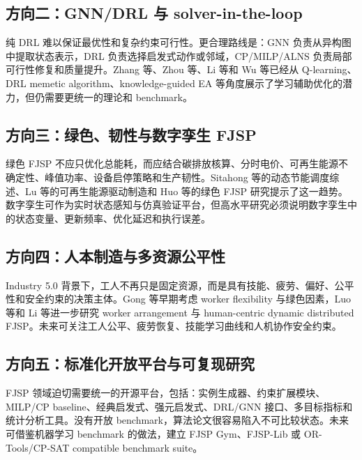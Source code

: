 \documentclass[UTF8,a4paper,11pt]{ctexart}
\begin{document}
\subsection{方向二：GNN/DRL 与 solver-in-the-loop}

纯 DRL 难以保证最优性和复杂约束可行性。更合理路线是：GNN 负责从异构图中提取状态表示，DRL 负责选择启发式动作或邻域，CP/MILP/ALNS 负责局部可行性修复和质量提升。Zhang 等、Zhou 等、Li 等和 Wu 等已经从 Q-learning、DRL memetic algorithm、knowledge-guided EA 等角度展示了学习辅助优化的潜力\cite{Zhang2024EATA,Zhou2025DRLMA,Li2025KEARL,Wu2025ABCQL}，但仍需要更统一的理论和 benchmark。

\subsection{方向三：绿色、韧性与数字孪生 FJSP}

绿色 FJSP 不应只优化总能耗，而应结合碳排放核算、分时电价、可再生能源不确定性、峰值功率、设备启停策略和生产韧性。Sitahong 等的动态节能调度综述、Lu 等的可再生能源驱动制造和 Huo 等的绿色 FJSP 研究提示了这一趋势\cite{Sitahong2025Review,Lu2026Renewable,Huo2026Green}。数字孪生可作为实时状态感知与仿真验证平台，但高水平研究必须说明数字孪生中的状态变量、更新频率、优化延迟和执行误差。

\subsection{方向四：人本制造与多资源公平性}

Industry 5.0 背景下，工人不再只是固定资源，而是具有技能、疲劳、偏好、公平性和安全约束的决策主体。Gong 等早期考虑 worker flexibility 与绿色因素\cite{Gong2021Green}，Luo 等和 Li 等进一步研究 worker arrangement 与 human-centric dynamic distributed FJSP\cite{Li2025HumanCentric}。未来可关注工人公平、疲劳恢复、技能学习曲线和人机协作安全约束。

\subsection{方向五：标准化开放平台与可复现研究}

FJSP 领域迫切需要统一的开源平台，包括：实例生成器、约束扩展模块、MILP/CP baseline、经典启发式、强元启发式、DRL/GNN 接口、多目标指标和统计分析工具。没有开放 benchmark，算法论文很容易陷入不可比较状态。未来可借鉴机器学习 benchmark 的做法，建立 FJSP Gym、FJSP-Lib 或 OR-Tools/CP-SAT compatible benchmark suite。
\end{document}
